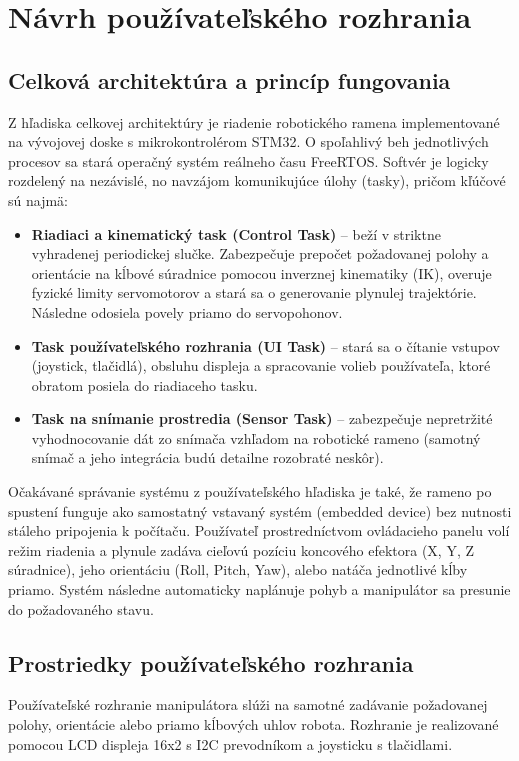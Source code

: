 \section{Návrh používateľského rozhrania}

\subsection{Celková architektúra a princíp fungovania}
Z hľadiska celkovej architektúry je riadenie robotického ramena implementované na vývojovej doske s mikrokontrolérom STM32. O spoľahlivý beh jednotlivých procesov sa stará operačný systém reálneho času FreeRTOS. Softvér je logicky rozdelený na nezávislé, no navzájom komunikujúce úlohy (tasky), pričom kľúčové sú najmä:
\begin{itemize}
    \item \textbf{Riadiaci a kinematický task (Control Task)} -- beží v striktne vyhradenej periodickej slučke. Zabezpečuje prepočet požadovanej polohy a orientácie na kĺbové súradnice pomocou inverznej kinematiky (IK), overuje fyzické limity servomotorov a stará sa o generovanie plynulej trajektórie. Následne odosiela povely priamo do servopohonov.
    \item \textbf{Task používateľského rozhrania (UI Task)} -- stará sa o čítanie vstupov (joystick, tlačidlá), obsluhu displeja a spracovanie volieb používateľa, ktoré obratom posiela do riadiaceho tasku.
    \item \textbf{Task na snímanie prostredia (Sensor Task)} -- zabezpečuje nepretržité vyhodnocovanie dát zo snímača vzhľadom na robotické rameno (samotný snímač a jeho integrácia budú detailne rozobraté neskôr).
\end{itemize}

Očakávané správanie systému z používateľského hľadiska je také, že rameno po spustení funguje ako samostatný 
vstavaný systém (embedded device) bez nutnosti stáleho pripojenia k počítaču. 
Používateľ prostredníctvom ovládacieho panelu volí režim riadenia a plynule zadáva cieľovú pozíciu koncového 
efektora (X, Y, Z súradnice), jeho orientáciu (Roll, Pitch, Yaw), alebo natáča jednotlivé kĺby priamo. 
Systém následne automaticky naplánuje pohyb a manipulátor sa presunie do 
požadovaného stavu.

\subsection{Prostriedky používateľského rozhrania}
Používateľské rozhranie manipulátora slúži na samotné zadávanie požadovanej polohy, orientácie alebo priamo kĺbových uhlov robota. 
Rozhranie je realizované pomocou LCD displeja 16x2 s I2C prevodníkom a joysticku s tlačidlami.

